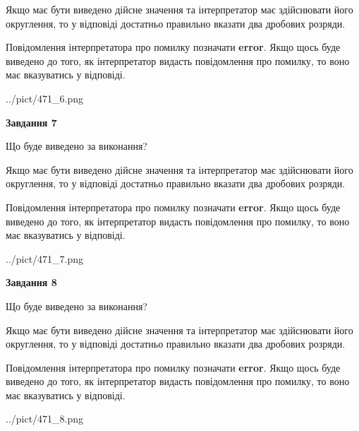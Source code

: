 \documentclass[12pt, ukrainian]{article}
\begin{document}
{\begin {Large}
Якщо має бути виведено дійсне значення та інтерпретатор має здійснювати його округлення, 
то у відповіді достатньо правильно вказати два дробових розряди.

Повідомлення інтерпретатора про помилку позначати \textbf{error}.
Якщо щось буде виведено до того, як інтерпретатор видасть повідомлення про помилку, 
то воно має вказуватись у відповіді. \par

\begin{center}
	{../pict/471_6.png}
\end{center}
\newpage

{\begin {center}\textbf{Завдання 7}\end {center}}\par
Що буде виведено за виконання? \par

Якщо має бути виведено дійсне значення та інтерпретатор має здійснювати його округлення, 
то у відповіді достатньо правильно вказати два дробових розряди.

Повідомлення інтерпретатора про помилку позначати \textbf{error}.
Якщо щось буде виведено до того, як інтерпретатор видасть повідомлення про помилку, 
то воно має вказуватись у відповіді. \par

\begin{center}
	{../pict/471_7.png}
\end{center}
\newpage

{\begin {center}\textbf{Завдання 8}\end {center}}\par
Що буде виведено за виконання? \par

Якщо має бути виведено дійсне значення та інтерпретатор має здійснювати його округлення, 
то у відповіді достатньо правильно вказати два дробових розряди.

Повідомлення інтерпретатора про помилку позначати \textbf{error}.
Якщо щось буде виведено до того, як інтерпретатор видасть повідомлення про помилку, 
то воно має вказуватись у відповіді. \par

\begin{center}
	{../pict/471_8.png}
\end{center}
\newpage


\end{Large}}
\end{document}
